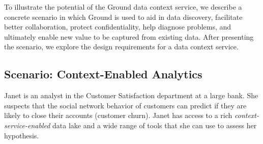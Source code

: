 \documentclass{sig-alternate}
\begin{document}

To illustrate the potential of the Ground data context service, we describe a concrete scenario in which Ground 
is used to aid in data discovery, facilitate better collaboration, protect confidentiality, help diagnose problems, and ultimately enable new value to be captured from existing data.
After presenting the scenario, we explore the design requirements for a data context service.



\subsection{Scenario: Context-Enabled Analytics }
\label{sec:scenarios}


Janet is an 
analyst in the Customer Satisfaction department at a large bank. 
She suspects that the social network behavior of customers can predict if they are likely to close their accounts (customer churn).
Janet has access to a rich \emph{context-service-enabled} data lake and a wide range of tools that she can use 
to assess her hypothesis. 
\end{document}
